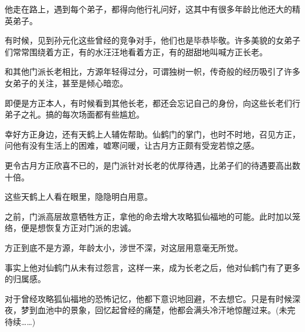 \begin{this_body}
他走在路上，遇到每个弟子，都得向他行礼问好，这其中有很多年龄比他还大的精英弟子。

有时候，见到孙元化这些曾经的竞争对手，他们也是毕恭毕敬。许多美貌的女弟子们常常围绕着方正，有的水汪汪地看着方正，有的甜甜地叫喊方正长老。

和其他门派长老相比，方源年轻得过分，可谓独树一帜，传奇般的经历吸引了许多女弟子的关注，甚至是倾心暗恋。

即便是方正本人，有时候看到其他长老，都还会忘记自己的身份，向这些长老们行弟子之礼。搞的每次场面都有些尴尬。

幸好方正身边，还有天鹤上人辅佐帮助。仙鹤门的掌门，也时不时地，召见方正，问他有没有生活上的困难，嘘寒问暖，让古月方正颇有受宠若惊之感。

更令古月方正欣喜不已的，是门派针对长老的优厚待遇，比弟子们的待遇要高出数十倍。

这些天鹤上人看在眼里，隐隐明白用意。

之前，门派高层故意牺牲方正，拿他的命去增大攻略狐仙福地的可能。此时加以笼络，便是想恢复方正对门派的忠诚。

方正到底不是方源，年龄太小，涉世不深，对这层用意毫无所觉。

事实上他对仙鹤门从未有过怨言，这样一来，成为长老之后，他对仙鹤门有了更多的归属感。

对于曾经攻略狐仙福地的恐怖记忆，他都下意识地回避，不去想它。只是有时候深夜，梦到血池中的景象，回忆起曾经的痛楚，他都会满头冷汗地惊醒过来。(未完待续……)

\end{this_body}

